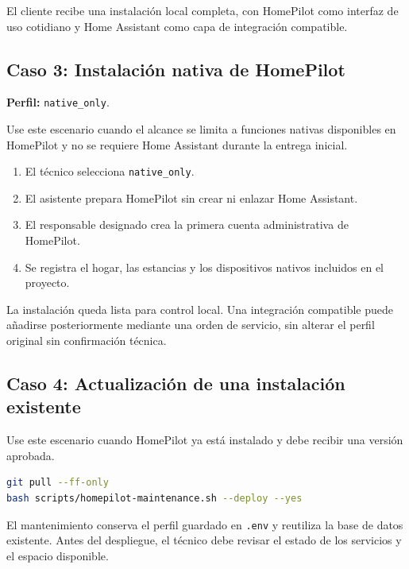 \begin{tcolorbox}[title=Resultado esperado]
El cliente recibe una instalación local completa, con HomePilot como interfaz de uso cotidiano y Home Assistant como capa de integración compatible.
\end{tcolorbox}

\subsection{Caso 3: Instalación nativa de HomePilot}
\textbf{Perfil:} \texttt{native\_only}.

Use este escenario cuando el alcance se limita a funciones nativas disponibles en HomePilot y no se requiere Home Assistant durante la entrega inicial.
\begin{enumerate}[itemsep=0.15cm]
    \item El técnico selecciona \texttt{native\_only}.
    \item El asistente prepara HomePilot sin crear ni enlazar Home Assistant.
    \item El responsable designado crea la primera cuenta administrativa de HomePilot.
    \item Se registra el hogar, las estancias y los dispositivos nativos incluidos en el proyecto.
\end{enumerate}

\begin{tcolorbox}[title=Resultado esperado]
La instalación queda lista para control local. Una integración compatible puede añadirse posteriormente mediante una orden de servicio, sin alterar el perfil original sin confirmación técnica.
\end{tcolorbox}

\subsection{Caso 4: Actualización de una instalación existente}

Use este escenario cuando HomePilot ya está instalado y debe recibir una versión aprobada.
\begin{lstlisting}[language=bash]
git pull --ff-only
bash scripts/homepilot-maintenance.sh --deploy --yes
\end{lstlisting}

El mantenimiento conserva el perfil guardado en \texttt{.env} y reutiliza la base de datos existente. Antes del despliegue, el técnico debe revisar el estado de los servicios y el espacio disponible.

